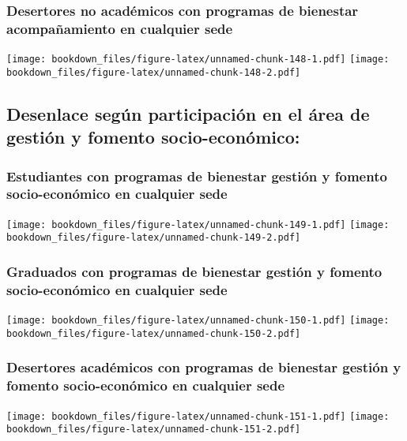\documentclass[]{article}
\theoremstyle{definition}
\theoremstyle{definition}
\theoremstyle{definition}
\theoremstyle{remark}
\begin{document}
\subsubsection{Desertores no académicos con programas de bienestar
acompañamiento en cualquier
sede}\label{desertores-no-academicos-con-programas-de-bienestar-acompanamiento-en-cualquier-sede}

\texttt{[image: bookdown\_files/figure-latex/unnamed-chunk-148-1.pdf]}
\texttt{[image: bookdown\_files/figure-latex/unnamed-chunk-148-2.pdf]}

\subsection{Desenlace según participación en el área de gestión y
fomento
socio-económico:}\label{desenlace-segun-participacion-en-el-area-de-gestion-y-fomento-socio-economico}

\subsubsection{Estudiantes con programas de bienestar gestión y fomento
socio-económico en cualquier
sede}\label{estudiantes-con-programas-de-bienestar-gestion-y-fomento-socio-economico-en-cualquier-sede}

\texttt{[image: bookdown\_files/figure-latex/unnamed-chunk-149-1.pdf]}
\texttt{[image: bookdown\_files/figure-latex/unnamed-chunk-149-2.pdf]}

\subsubsection{Graduados con programas de bienestar gestión y fomento
socio-económico en cualquier
sede}\label{graduados-con-programas-de-bienestar-gestion-y-fomento-socio-economico-en-cualquier-sede}

\texttt{[image: bookdown\_files/figure-latex/unnamed-chunk-150-1.pdf]}
\texttt{[image: bookdown\_files/figure-latex/unnamed-chunk-150-2.pdf]}

\subsubsection{Desertores académicos con programas de bienestar gestión
y fomento socio-económico en cualquier
sede}\label{desertores-academicos-con-programas-de-bienestar-gestion-y-fomento-socio-economico-en-cualquier-sede}

\texttt{[image: bookdown\_files/figure-latex/unnamed-chunk-151-1.pdf]}
\texttt{[image: bookdown\_files/figure-latex/unnamed-chunk-151-2.pdf]}
\end{document}
